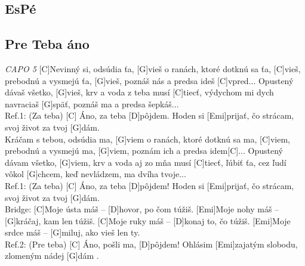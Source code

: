 \documentclass[10pt]{article}
\begin{document}
\begin{Large}
\newpage
\section{EsPé}

\begin{minipage}{\textwidth}
\subsection{Pre Teba áno}
\begin{multicols}{2}
	\begin{guitar}
		\textit{CAPO 5}
		[C]Nevinný si, odsúdia ťa, [G]vieš
		o ranách, ktoré dotknú sa ťa, [C]vieš,
		prebodnú a vysmejú ťa, [G]vieš,
		poznáš nás a predsa ideš [C]vpred...
		Opustený dávaš všetko, [G]vieš,
		krv a voda z teba musí [C]tiecť,
		výdychom mi dych navraciaš [G]späť,
		poznáš ma a predsa šepkáš...
		\\
		Ref.1: (Za teba) [C] Áno, za teba [D]pôjdem.
		Hoden si [Emi]prijať, čo strácam,
		svoj život za tvoj [G]dám.
		\\
		[C]Kráčam s tebou, odsúdia ma, [G]viem
		o ranách, ktoré dotknú sa ma, [C]viem,
		prebodnú a vysmejú ma, [G]viem,
		poznám ich a predsa idem[C]...
		Opustený dávam všetko, [G]viem,
		krv a voda aj zo mňa musí [C]tiecť,
		ľúbiť ťa, cez ľudí vôkol [G]chcem,
		keď nevládzem, ma dvíha tvoje...
		\\
		Ref.1: (Za teba) [C] Áno, za teba [D]pôjdem!
		Hoden si [Emi]prijať, čo strácam,
		svoj život za tvoj [G]dám.
		\\
		Bridge: [C]Moje ústa máš – [D]hovor, po čom túžiš.
		[Emi]Moje nohy máš – [G]kráčaj, kam len túžiš.
		[C]Moje ruky máš – [D]konaj to, čo túžiš.
		[Emi]Moje srdce máš – [G]miluj, ako vieš len ty.
		\\
		Ref.2: (Pre teba) [C] Áno, pošli ma, [D]pôjdem!
		Ohlásim [Emi]zajatým slobodu, zlomeným nádej [G]dám .
	\end{guitar}
\end{multicols}
\end{minipage}

\begin{minipage}{\textwidth}

\end{minipage}
\end{Large}
\end{document}
